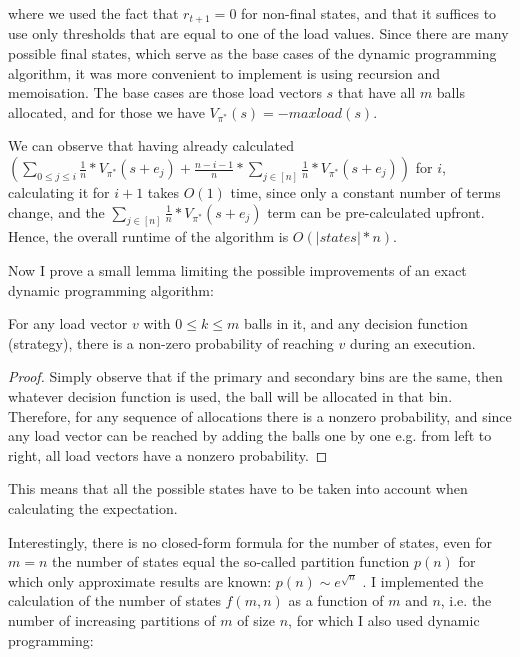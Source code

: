 where we used the fact that $r_{t+1}=0$ for non-final states, and that it suffices to use only thresholds that are equal to one of the load values. Since there are many possible final states, which serve as the base cases of the dynamic programming algorithm, it was more convenient to implement is using recursion and memoisation. The base cases are those load vectors $s$ that have all $m$ balls allocated, and for those we have $V_{\pi^*}(s)=-maxload(s)$. 


We can observe that having already calculated $(\sum_{0\leq j \leq i} \frac{1}{n}*V_{\pi^*}(s+e_j) + \frac{n-i-1}{n} * \sum_{j \in [n]} \frac{1}{n}*V_{\pi^*}(s+e_j))$ for $i$, calculating it for $i+1$ takes $O(1)$ time, since only a constant number of terms change, and the $\sum_{j \in [n]} \frac{1}{n}*V_{\pi^*}(s+e_j)$ term can be pre-calculated upfront. Hence, the overall runtime of the algorithm is $O(|states|*n)$.


Now I prove a small lemma limiting the possible improvements of an exact dynamic programming algorithm:


\begin{lemma} \label{lemma: everystatereachable}
For any load vector $v$ with $0\leq k\leq m$ balls in it, and any decision function (strategy), there is a non-zero probability of reaching $v$ during an execution.
\end{lemma}

\begin{proof}
    Simply observe that if the primary and secondary bins are the same, then whatever decision function is used, the ball will be allocated in that bin. Therefore, for any sequence of allocations there is a nonzero probability, and since any load vector can be reached by adding the balls one by one e.g. from left to right, all load vectors have a nonzero probability. 
\end{proof}



This means that all the possible states have to be taken into account when calculating the expectation.



Interestingly, there is no closed-form formula for the number of states, even for $m=n$ the number of states equal the so-called partition function $p(n)$ for which only approximate results are known: $p(n) \sim e^{\sqrt{n}}$ \cite{hardy1918partitionfunction}. I implemented the calculation of the number of states $f(m, n)$ as a function of $m$ and $n$, i.e. the number of increasing partitions of $m$ of size $n$, for which I also used dynamic programming:



